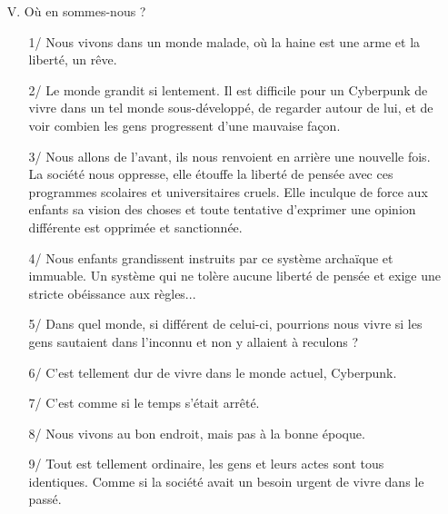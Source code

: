 \documentclass[11pt,twoside,a4paper]{book}
\begin{document}
\begin{enumerate}
\begin{enumerate}
		\item[13/] Nous vivrons dans un m{\'e}lange de pass{\'e} et de pr{\'e}sent.
		\item[14/] Le mauvais vient de l'homme et le bon de la technologie.
		\item[15/] Le Net contr{\^o}lera le petit homme et nous contr{\^o}lerons le net.
		\item[16/] Et ce que vous ne contr{\^o}lerez pas, vous contr{\^o}lera.
		\item[17/] L'Information est le POUVOIR !
	\end{enumerate}
	\item[V.] O{\`u} en sommes-nous ?
	\begin{enumerate}
		\setlength{\itemsep}{1pt}
		\setlength{\parskip}{0pt}
		\setlength{\parsep}{0pt}
		
		\item[1/] Nous vivons dans un monde malade, o{\`u} la haine est une arme et la libert{\'e}, un r{\^e}ve.
		\item[2/] Le monde grandit si lentement. Il est difficile pour un Cyberpunk de vivre dans un tel monde sous-d{\'e}velopp{\'e}, de regarder autour de lui, et de voir combien les gens progressent d'une mauvaise fa\c{c}on.
		\item[3/] Nous allons de l'avant, ils nous renvoient en arri{\`e}re une nouvelle fois. La soci{\'e}t{\'e} nous oppresse, elle {\'e}touffe la libert{\'e} de pens{\'e}e avec ces programmes scolaires et universitaires cruels. Elle inculque de force aux enfants sa vision des choses et toute tentative d'exprimer une opinion diff{\'e}rente est opprim{\'e}e et sanctionn{\'e}e.
		\item[4/] Nous enfants grandissent instruits par ce syst{\`e}me archa{\"i}que et immuable. Un syst{\`e}me qui ne tol{\`e}re aucune libert{\'e} de pens{\'e}e et exige une stricte ob{\'e}issance aux r{\`e}gles...
		\item[5/] Dans quel monde, si diff{\'e}rent de celui-ci, pourrions nous vivre si les gens sautaient dans l'inconnu et non y allaient {\`a} reculons ?
		\item[6/] C'est tellement dur de vivre dans le monde actuel, Cyberpunk.
		\item[7/] C'est comme si le temps s'{\'e}tait arr{\^e}t{\'e}.
		\item[8/] Nous vivons au bon endroit, mais pas {\`a} la bonne {\'e}poque.
		\item[9/] Tout est tellement ordinaire, les gens et leurs actes sont tous identiques. Comme si la soci{\'e}t{\'e} avait un besoin urgent de vivre dans le pass{\'e}.

\end{enumerate}
\end{enumerate}
\end{document}
